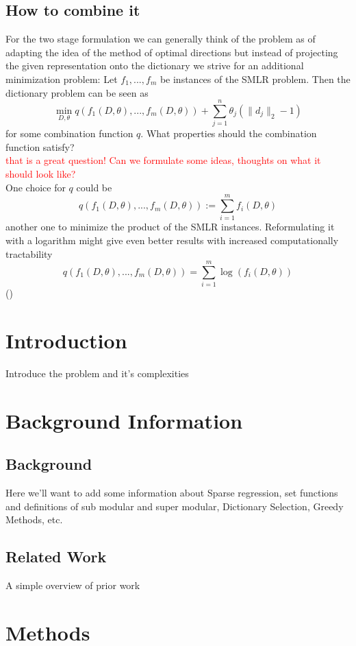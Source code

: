 \documentclass{article}
\begin{document}
\subsection{How to combine it}
For the two stage formulation we can generally think of the problem as of adapting the idea of the method of optimal directions but instead of projecting the given representation onto the dictionary we strive for an additional minimization problem:
Let $f_1, ..., f_m$ be instances of the SMLR problem. Then the dictionary problem can be seen as
\[
\min_{D, \theta} q(f_1(D, \theta), ..., f_m(D, \theta)) + \sum_{j=1}^n \theta_j (\| d_j\|_2 - 1)
\]
for some combination function $q$. What properties should the combination function satisfy?
\\
\textcolor{red}{that is a great question! Can we formulate some ideas, thoughts on what it should look like?}
 \\
 One choice for $q$ could be 
 \[q(f_1(D, \theta), ..., f_m(D, \theta)) := \sum_{i=1}^m f_i(D, \theta)\]
  another one to minimize the product of the SMLR instances. Reformulating it with a logarithm might give even better results with increased computationally tractability 
 \[
 q(f_1(D, \theta), ..., f_m(D, \theta)) = \sum_{i=1}^m \log (f_i(D, \theta))
 \]
 ()
 
\section{Introduction} \label{introduction}
Introduce the problem and it's complexities

\section{Background Information} \label{background}
\subsection{Background}
Here we'll want to add some information about Sparse regression, set functions and definitions of sub modular and super modular, Dictionary Selection, Greedy Methods, etc.

\subsection{Related Work}
A simple overview of prior work


\section{Methods} \label{methods}
\end{document}
